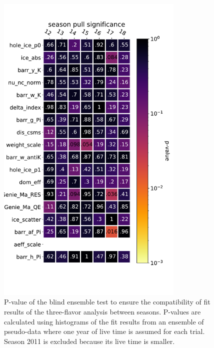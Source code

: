 \begin{figure}
    \centering
    \includegraphics[width=0.8\textwidth]{figures/measurement/three_flavor/seasonal_stability/blind_ensemble_seasons_12-18_p-values}
    \caption{P-value of the blind ensemble test to ensure the compatibility of fit results of the three-flavor analysis between seasons. P-values are calculated using histograms of the fit results from an ensemble of pseudo-data where one year of live time is assumed for each trial. Season 2011 is excluded because its live time is smaller.\label{fig:pval-nuisance-parameter-ensemble}}
\end{figure}
